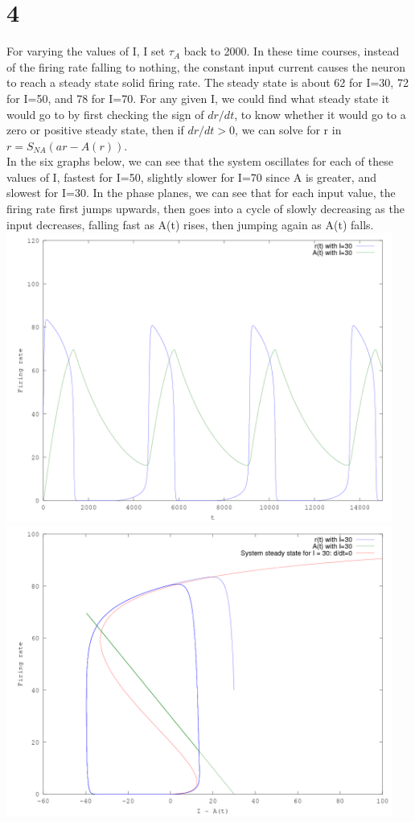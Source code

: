 \documentclass[11pt]{article}
\begin{document}
\section*{4}
For varying the values of I, I set $\tau_A$ back to 2000.
In these time courses, instead of the firing rate falling
to nothing, the constant input current causes the neuron
to reach a steady state solid firing rate.
The steady state is about 62 for I=30, 72 for I=50,
and 78 for I=70.
For any given I, we could find what steady state it would 
go to by first checking the sign of $dr/dt$,
to know whether it would go to a zero or positive steady state,
then if $dr/dt>0$, we can solve for r in $r=S_{NA}(ar-A(r))$.\\
In the six graphs below, we can see that the system oscillates
for each of these values of I, fastest for I=50, slightly slower
for I=70 since A is greater, and slowest for I=30.
In the phase planes, we can see that for each input value, 
the firing rate first jumps upwards, then goes into a cycle of
slowly decreasing as the input decreases, falling fast as A(t) rises,
then jumping again as A(t) falls.\\
\newpage
\includegraphics[width=5in]{4ta.png}\\
\includegraphics[width=5in]{4pa.png}\\
\end{document}
